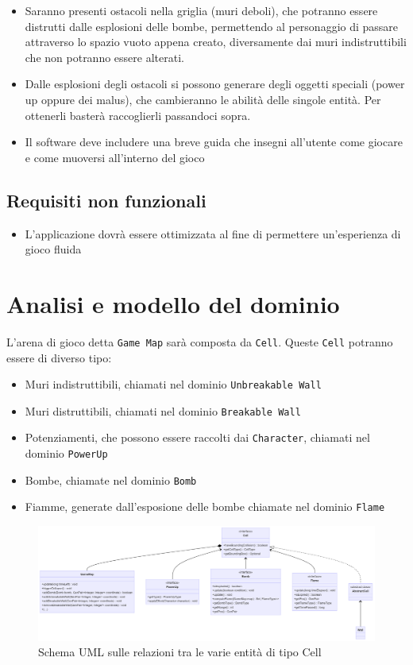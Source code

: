 \documentclass[a4paper,12pt]{report}
\begin{document}
\begin{itemize}
        \item Saranno presenti ostacoli nella griglia (muri deboli), che potranno essere distrutti dalle esplosioni delle bombe, permettendo al personaggio di passare attraverso lo spazio vuoto appena creato, diversamente dai muri indistruttibili che non potranno essere alterati.
        \item Dalle esplosioni degli ostacoli si possono generare degli oggetti speciali (power up oppure dei malus), che cambieranno le abilità delle singole entità. Per ottenerli basterà raccoglierli passandoci sopra.
        \item Il software deve includere una breve guida che insegni all'utente come giocare e come muoversi all'interno del gioco
\end{itemize}

\subsection*{Requisiti non funzionali}
\begin{itemize}
    \item L’applicazione dovrà essere ottimizzata al fine di permettere un’esperienza di gioco fluida 
\end{itemize}

\section{Analisi e modello del dominio}

L'arena di gioco detta \verb|Game Map| sarà composta da \verb|Cell|. 
Queste \verb|Cell| potranno essere di diverso tipo: 

\begin{itemize}
    \item Muri indistruttibili, chiamati nel dominio \verb|Unbreakable Wall|
    \item Muri distruttibili, chiamati nel dominio \verb|Breakable Wall|
    \item Potenziamenti, che possono essere raccolti dai \verb|Character|, chiamati nel dominio \verb|PowerUp|
    \item Bombe, chiamate nel dominio \verb|Bomb|
    \item Fiamme, generate dall'esposione delle bombe chiamate nel dominio \verb|Flame|
\end{itemize}

\begin{figure}[h]
\centering{}
\includegraphics[width=\textwidth]{img/interface-cell.png}
\caption{Schema UML sulle relazioni tra le varie entità di tipo Cell}
\end{figure}
\end{document}
